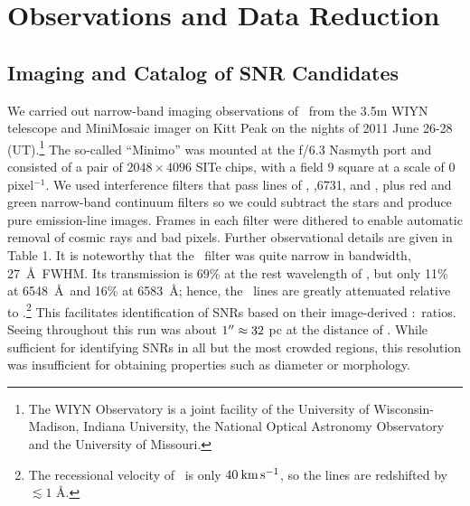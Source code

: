 \section{Observations and Data Reduction \label{sec:observations}}
\subsection{Imaging and Catalog of SNR Candidates}

We carried out narrow-band imaging observations of \gal\ from the 3.5m WIYN telescope and MiniMosaic imager on Kitt Peak on the nights of 2011 June 26-28 (UT).\footnote{The WIYN Observatory is a joint facility of the University of Wisconsin-Madison, Indiana University, the National Optical Astronomy Observatory and the University of Missouri.}  The so-called ``Minimo'' was mounted at the f/6.3 Nasmyth port and consisted of a pair of $2048\times4096$ SITe chips, with a field  9 square at a scale of 0 pixel$^{-1}$.  We used interference filters that pass lines of \ha, \sii {},6731, and \oiii {}, plus red and green narrow-band continuum filters so we could subtract the stars and produce pure emission-line images. Frames in each filter were dithered to enable automatic removal of cosmic rays and bad pixels.  Further observational details are given in Table 1.  It is noteworthy that the \ha\ filter was quite narrow in bandwidth, 27\ \AA\ FWHM. Its transmission is 69\% at the rest wavelength of \ha, but only 11\% at 6548\ \AA\ and 16\% at 6583\ \AA; hence, the \nii\ lines are greatly attenuated relative to \ha.\footnote{The recessional velocity of \gal\ is only $40 \:\rm{km\,s^{-1}}$, so the lines are redshifted by $\lesssim 1$ \AA.}  This facilitates identification of SNRs based on their image-derived \sii:\ha\ ratios.  Seeing throughout this run was about $1\mbox{$^{\prime\prime}$} \approx 32$ pc at the distance of \gal.  While sufficient for identifying SNRs in all but the most crowded regions, this resolution was insufficient for obtaining properties such as diameter or morphology.  


